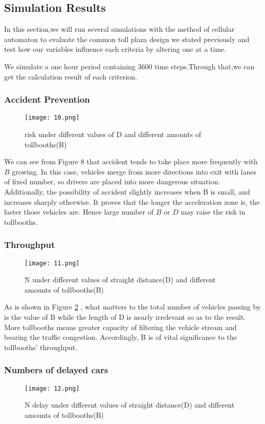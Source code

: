 \subsection{Simulation Results}
In this section,we will run several simulations with the method of cellular automaton to evaluate the common toll plaza design we stated previously and test how our variables influence each criteria by altering one at a time.

We simulate a one hour period containing $3600$ time steps.Through that,we can get the calculation result of each criterion.
\subsubsection{Accident Prevention}
	\begin{figure}[h]
	\centering
	\texttt{[image: 10.png]}
	\caption{risk under different values of D and different amounts of tollbooths(B)}
	\label{7}
	\end{figure}

We can see from Figure 8 that accident tends to take place more frequently with $B$ growing. In this case, vehicles merge from more directions into exit with lanes of fixed number, so drivers are placed into more dangerous situation. Additionally, the possibility of accident slightly increases when B is small, and increases sharply otherwise. It proves that the longer the acceleration zone is, the faster those vehicles are. Hence large number of $B$ or $D$ may raise the risk in tollbooths.

\subsubsection{Throughput}
	\begin{figure}[h]
	\centering
	\texttt{[image: 11.png]}
	\caption{N under different values of straight distance(D) and different amounts of tollbooths(B)}
	\label{8}
	\end{figure}

As is shown in Figure \ref{8} , what matters to the total number of vehicles passing by is the value of B while the length of D is nearly irrelevant so as to the result. More tollbooths means greater capacity of filtering the vehicle stream and bearing the traffic congestion. Accordingly, B is of vital significance to the tollbooths' throughput.

\subsubsection{Numbers of delayed cars}
	\begin{figure}[h]
	\centering
	\texttt{[image: 12.png]}
	\caption{N delay under different values of straight distance(D) and different amounts of tollbooths(B)}
	\label{9}
	\end{figure}

